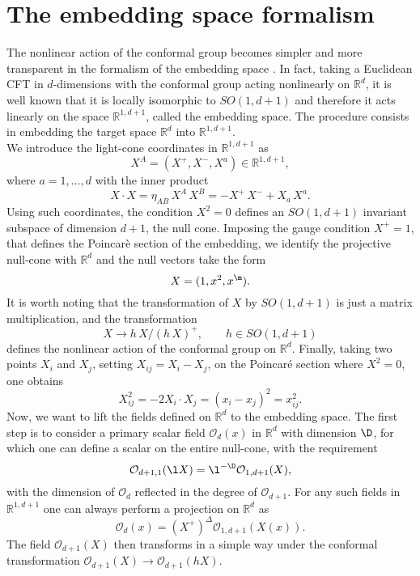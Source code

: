 \documentclass[a4paper,11pt,openright,twoside]{book}
\newcommand{\mO}{\mathcal{O}}
\numberwithin{equation}{section}
\begin{document}
\section{The embedding space formalism}
The nonlinear action of the conformal group becomes simpler and more transparent in the formalism of the {embedding space} \cite{Simmons_Duffin_2014, Simmons-Duffin:2016gjk}. In fact, taking a Euclidean CFT in $d$-dimensions with the conformal group acting 
nonlinearly on $\mathbb{R}^d$, it is well known that it is locally isomorphic to $SO(1,d+1)$ and therefore it acts linearly on the space $\mathbb{R}^{1,d+1}$, called the {embedding space}. The procedure consists in embedding the target space $\mathbb{R}^d$ into $\mathbb{R}^{1,d+1}$.\\  
We introduce the light-cone coordinates in $\mathbb{R}^{1,d+1}$ as
\begin{equation}
	X^A=(X^+,X^-,X^a)\in\mathbb{R}^{1,d+1},
\end{equation}
where $a=1,\dots,d$ with the inner product
\begin{equation}
	X\cdot X=\eta_{AB}\,X^A\,X^B=-X^+\,X^-+X_a\,X^a.
\end{equation}
Using such coordinates, the condition $X^2=0$ defines an $SO(1,d+1)$ invariant subspace of dimension $d+1$, the null cone. Imposing the gauge condition $X^+=1$, that defines the {Poincar\`e section} of the embedding, we identify the projective null-cone with $\mathbb{R}^d$ and the null vectors take the form
\begin{equation}
	X=(1,x^2,x^\m)\label{poinc}.
\end{equation}
It is worth noting that the transformation of $X$ by $SO(1,d+1)$ is just a matrix multiplication, and the transformation
\begin{equation}
	X\to h\,X/(h\,X)^+, \qquad h\in SO(1,d+1)
\end{equation}
defines the nonlinear action of the conformal group on $\mathbb{R}^d$. Finally, taking two points $X_i$ and $X_j$, setting $X_{ij}=X_i-X_j$, on the Poincar\'e section where $X^2=0$, one obtains
\begin{equation}
	X_{ij}^2=-2X_i\cdot X_j=(x_i-x_j)^2=x_{ij}^2.\label{xxx}
\end{equation}
Now, we want to lift the fields defined on $\mathbb{R}^d$ to the embedding space. The first step is to consider a primary scalar field $\mO_d(x)$ in $\mathbb{R}^d$ with dimension $\D$, for which one can define a scalar on the entire null-cone, with the requirement
\begin{equation}
	\mO_{d+1,1}(\l X)=\l^{-\D}\mO_{1,d+1}(X),
\end{equation}
with the dimension of $\mO_d$ reflected in the degree of $\mO_{d+1}$.
For any such fields in $\mathbb{R}^{1,d+1}$ one can always perform a projection on $\mathbb{R}^d$ as
\begin{equation}
	\mO_{d}(x)=\left(X^+\right)^{\Delta}\mO_{1,d+1}(X(x)).
\end{equation}
The field $\mO_{d+1}(X)$ then transforms in a simple way under the conformal transformation $\mO_{d+1}(X)\to \mO_{d+1}(hX)$. 
\end{document}
